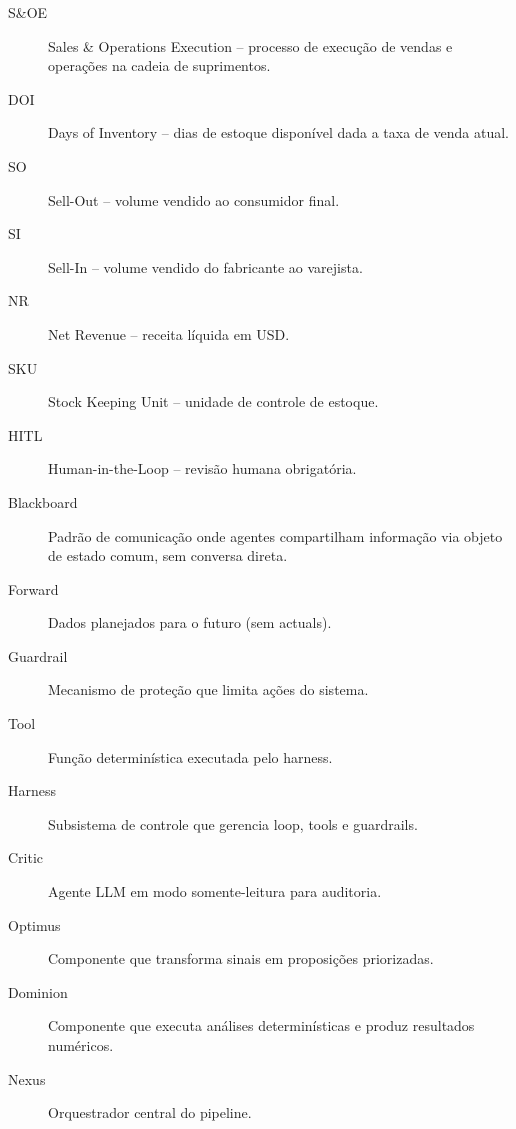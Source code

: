 \documentclass[a4paper, 12pt]{report}
\theoremstyle{definition}
\theoremstyle{remark}
\begin{document}
\begin{description}
  \item[S\&OE] Sales \& Operations Execution -- processo de execu\c{c}\~ao
    de vendas e opera\c{c}\~oes na cadeia de suprimentos.
  \item[DOI] Days of Inventory -- dias de estoque dispon\'ivel dada
    a taxa de venda atual.
  \item[SO] Sell-Out -- volume vendido ao consumidor final.
  \item[SI] Sell-In -- volume vendido do fabricante ao varejista.
  \item[NR] Net Revenue -- receita l\'iquida em USD.
  \item[SKU] Stock Keeping Unit -- unidade de controle de estoque.
  \item[HITL] Human-in-the-Loop -- revis\~ao humana obrigat\'oria.
  \item[Blackboard] Padr\~ao de comunica\c{c}\~ao onde agentes compartilham
    informa\c{c}\~ao via objeto de estado comum, sem conversa direta.
  \item[Forward] Dados planejados para o futuro (sem actuals).
  \item[Guardrail] Mecanismo de prote\c{c}\~ao que limita a\c{c}\~oes do sistema.
  \item[Tool] Fun\c{c}\~ao determin\'istica executada pelo harness.
  \item[Harness] Subsistema de controle que gerencia loop, tools
    e guardrails.
  \item[Critic] Agente LLM em modo somente-leitura para auditoria.
  \item[Optimus] Componente que transforma sinais em proposi\c{c}\~oes
    priorizadas.
  \item[Dominion] Componente que executa an\'alises determin\'isticas
    e produz resultados num\'ericos.
  \item[Nexus] Orquestrador central do pipeline.
\end{description}
\end{document}
